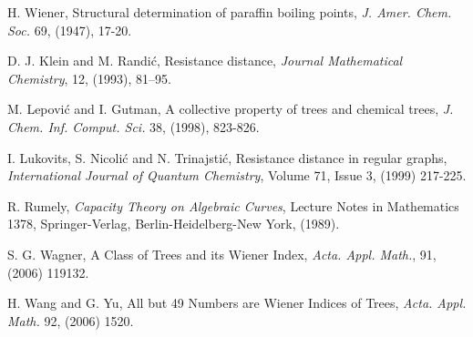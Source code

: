 \documentclass[12pt]{amsart}
\theoremstyle{example}
\theoremstyle{definition}
\theoremstyle{notation}
\begin{document}
\begin{thebibliography}{999}
 H. Wiener, Structural determination of paraffin boiling points,  {\em J. Amer. Chem. Soc.} 69, (1947),
17-20.

 D. J. Klein and M. Randi\'c, Resistance
distance, {\em Journal Mathematical Chemistry}, 12, (1993), 81--95.

 M. Lepovi\'{c} and I. Gutman, A collective property of trees and chemical trees,  {\em J. Chem. Inf. Comput. Sci.} 38, (1998), 823-826.

 I. Lukovits, S. Nicoli\'{c} and N. Trinajsti\'{c}, Resistance distance in regular graphs, {\em International Journal of Quantum Chemistry}, Volume 71, Issue 3, (1999) 217-225.

 R. Rumely, {\em Capacity Theory on Algebraic Curves}, Lecture Notes in
Mathematics 1378, Springer-Verlag, Berlin-Heidelberg-New York, (1989).

 S. G. Wagner, A Class of Trees and its Wiener Index, {\em Acta. Appl. Math.}, 91, (2006) 119132.

 H. Wang and G. Yu, All but 49 Numbers are Wiener Indices of Trees, {\em Acta. Appl. Math.}  92, (2006) 1520.

\end{thebibliography}
\end{document}
